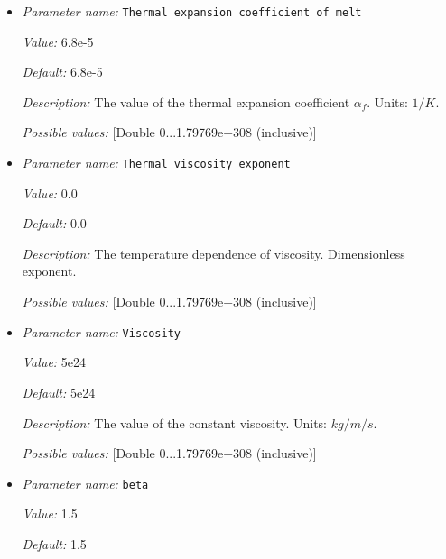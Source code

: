 \begin{itemize}
{\it Default:} 4e-5


{\it Description:} The value of the thermal expansion coefficient $\alpha_s$. Units: $1/K$.


{\it Possible values:} [Double 0...1.79769e+308 (inclusive)]
\item {\it Parameter name:} {\tt Thermal expansion coefficient of melt}
\label{parameters:Material model/Latent heat melt/Thermal expansion coefficient of melt}


{\it Value:} 6.8e-5


{\it Default:} 6.8e-5


{\it Description:} The value of the thermal expansion coefficient $\alpha_f$. Units: $1/K$.


{\it Possible values:} [Double 0...1.79769e+308 (inclusive)]
\item {\it Parameter name:} {\tt Thermal viscosity exponent}
\label{parameters:Material model/Latent heat melt/Thermal viscosity exponent}


{\it Value:} 0.0


{\it Default:} 0.0


{\it Description:} The temperature dependence of viscosity. Dimensionless exponent.


{\it Possible values:} [Double 0...1.79769e+308 (inclusive)]
\item {\it Parameter name:} {\tt Viscosity}
\label{parameters:Material model/Latent heat melt/Viscosity}


{\it Value:} 5e24


{\it Default:} 5e24


{\it Description:} The value of the constant viscosity. Units: $kg/m/s$.


{\it Possible values:} [Double 0...1.79769e+308 (inclusive)]
\item {\it Parameter name:} {\tt beta}
\label{parameters:Material model/Latent heat melt/beta}


{\it Value:} 1.5


{\it Default:} 1.5



\end{itemize}
